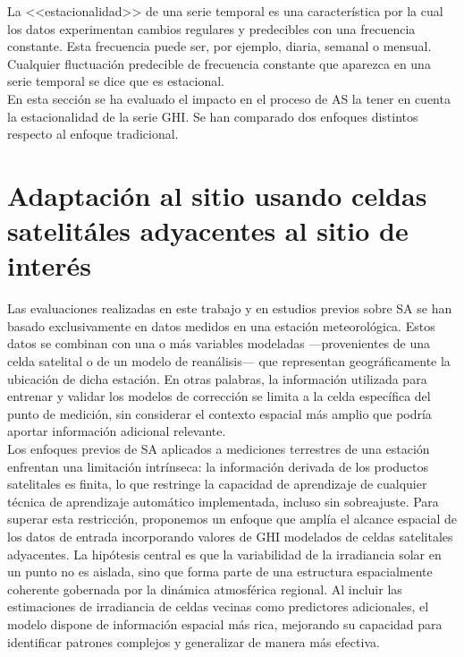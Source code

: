 La <<estacionalidad>> de una serie temporal es una característica por la cual los datos experimentan cambios regulares y predecibles con una frecuencia constante. Esta frecuencia puede ser, por ejemplo, diaria, semanal o mensual. Cualquier fluctuación predecible de frecuencia constante que aparezca en una serie temporal se dice que es estacional.\\



En esta sección se ha evaluado el impacto en el proceso de AS la tener en cuenta la estacionalidad de la serie GHI. Se han comparado dos enfoques distintos respecto al enfoque tradicional. 






\section{Adaptación al sitio usando celdas satelitáles adyacentes al sitio de interés}
Las evaluaciones realizadas en este trabajo y en estudios previos sobre SA se han basado exclusivamente en datos medidos en una estación meteorológica. Estos datos se combinan con una o más variables modeladas —provenientes de una celda satelital o de un modelo de reanálisis— que representan geográficamente la ubicación de dicha estación. En otras palabras, la información utilizada para entrenar y validar los modelos de corrección se limita a la celda específica del punto de medición, sin considerar el contexto espacial más amplio que podría aportar información adicional relevante.\\

Los enfoques previos de SA aplicados a mediciones terrestres de una estación enfrentan una limitación intrínseca: la información derivada de los productos satelitales es finita, lo que restringe la capacidad de aprendizaje de cualquier técnica de aprendizaje automático implementada, incluso sin sobreajuste. Para superar esta restricción, proponemos un enfoque que amplía el alcance espacial de los datos de entrada incorporando valores de GHI modelados de celdas satelitales adyacentes. La hipótesis central es que la variabilidad de la irradiancia solar en un punto no es aislada, sino que forma parte de una estructura espacialmente coherente gobernada por la dinámica atmosférica regional. Al incluir las estimaciones de irradiancia de celdas vecinas como predictores adicionales, el modelo dispone de información espacial más rica, mejorando su capacidad para identificar patrones complejos y generalizar de manera más efectiva.\\

